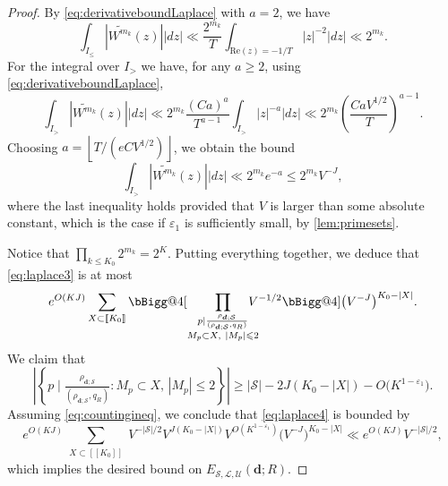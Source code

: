 \documentclass[11pt]{amsart}
\makeatletter
\theoremstyle{definition}
\renewcommand{\leq}{\leqslant}
\renewcommand{\geq}{\geqslant}
\renewcommand{\Re}{\mathrm{Re}}
\newcommand{\sinterval}[1]{[\![#1]\!] }
\newcommand{\abs}[1]{\left|#1\right|}
\newcommand{\eps}{\varepsilon}
\renewcommand{\d}{\boldsymbol{d}}
\newcommand{\cstH}{\eps_1}
\newcommand{\quantity}{\repK^{1-\cstH}}
\newcommand{\curlyL}{V}
\newcommand{\fprod}[1]{\rho_{#1}}
\newcommand{\lit}{\mathcal{L}}
\newcommand{\unlit}{\mathcal{U}}
\newcommand{\s}{\mathcal{S}}
\newcommand{\modulus}{q}
\newcommand{\repR}{J}
\newcommand{\repK}{K}
\newcommand{\insingleproof}{M}
\newcommand{\xinsingleproof}{X}
\newcommand{\otherL}{T}
\newcommand{\littleh}{k}
\newcommand{\Vast}{\bBigg@{4}}
\makeatother
\begin{document}
\begin{proof}
By \cref{eq:derivativeboundLaplace} with $a=2$, we have
\begin{equation*}
\int_{I_{\leq}} |\widetilde{W^{m_{\littleh}}}(z)||dz| \ll \frac{2^{m_{\littleh}}}{\otherL} \int_{\Re(z)={-1/\otherL}} {|z|^{-2}} |dz| \ll 2^{m_{\littleh}}.
\end{equation*}
For the integral over $I_>$ we have, for any $a\geq 2$, using \cref{eq:derivativeboundLaplace},
\begin{equation*}
\int_{I_>} |\widetilde{W^{m_{\littleh}}}(z)||dz| \ll 2^{m_{\littleh}}\frac{(Ca)^{a}}{\otherL^{a-1}} \int_{I_>} {|z|^{-a}} |dz| \ll 2^{m_{\littleh}}  \left(\frac{C a\curlyL^{1/2}}{\otherL}\right)^{a-1}. 
\end{equation*}
Choosing $a = \left\lfloor {\otherL}/{(eC\curlyL^{1/2})} \right\rfloor$, we obtain the bound
\begin{equation*}
\int_{I_>} |\widetilde{W^{m_{\littleh}}}(z)||dz| \ll 2^{m_{\littleh}} e^{- a} \leq 2^{m_{\littleh}} \curlyL^{-\repR},
\end{equation*}
where the last inequality holds provided that $\curlyL$ is larger than some absolute constant, which is the case if $\cstH$ is sufficiently small, by \cref{lem:primesets}. 

Notice that $\prod_{\littleh \leq K_0} 2^{m_{\littleh}} = 2^{\repK}$. Putting everything together, we deduce that \cref{eq:laplace3} is at most
\begin{equation}
\label{eq:laplace4}
 e^{O(\repK \repR)} \sum_{\substack{\xinsingleproof \subset \sinterval{K_0} }}\Vast[\prod_{\substack{p \mid \frac{\fprod{\d; \s}}{(\fprod{\d; \s}, \modulus_R)}\\ \insingleproof_p\subset \xinsingleproof,\  |\insingleproof_p|\leq 2}}\!\!\!\!\!\!  \curlyL^{-1/2} \Vast]  \big(\curlyL^{-\repR}\big)^{K_0 - |\xinsingleproof|}.
\end{equation}
 We claim that
\begin{equation}
\label{eq:countingineq}
\abs{ \left\{p \mid \tfrac{\fprod{\d; \s}}{(\fprod{\d; \s}, \modulus_R)} : \insingleproof_p \subset \xinsingleproof,\, |\insingleproof_p| \leq 2\right\} } \geq |\s| - 2 \repR (K_0 - |\xinsingleproof|) - O\big(\quantity\big).
\end{equation}
Assuming \cref{eq:countingineq}, we conclude that \cref{eq:laplace4} is bounded by
\begin{equation*}
 e^{O(\repK \repR)}\!\!\! \sum_{\substack{\xinsingleproof\subset \sinterval{K_0} }}\curlyL^{-|\s|/2} \curlyL^{\repR(K_0- |\xinsingleproof|)}\curlyL^{O(\quantity)}  \big(\curlyL^{-\repR}\big)^{K_0 - |\xinsingleproof|} \ll  e^{O(\repK \repR)} \curlyL^{-|\s|/2},
\end{equation*}
which implies the desired bound on $E_{\s,\lit,\unlit}(\d; R)$.


\end{proof}
\end{document}

